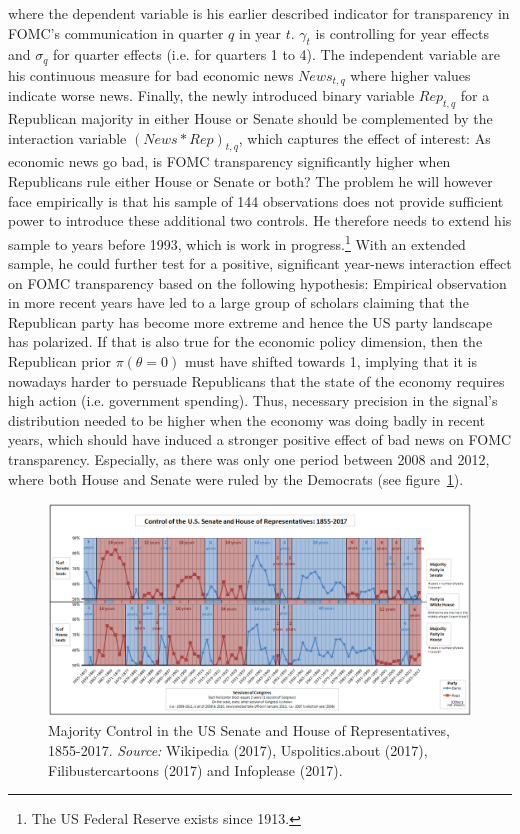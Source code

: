 \documentclass[paper=a4,12pt,DIV=11,twoside=false]{scrartcl}
\begin{document}
\noindent where the dependent variable is his earlier described indicator for transparency in FOMC's communication in quarter $q$ in year $t$. $\gamma_{t}$ is controlling for year effects and $\sigma_{q}$ for quarter effects (i.e. for quarters 1 to 4). The independent variable are his continuous measure for bad economic news $News_{t,q}$ where higher values indicate worse news. Finally, the newly introduced binary variable $Rep_{t,q}$ for a Republican majority in either House or Senate should be complemented by the interaction variable $(News*Rep)_{t,q}$, which captures the effect of interest: As economic news go bad, is FOMC transparency significantly higher when Republicans rule either House or Senate or both? The problem he will however face empirically is that his sample of 144 observations does not provide sufficient power to introduce these additional two controls. He therefore needs to extend his sample to years before 1993, which is work in progress.\footnote{The US Federal Reserve exists since 1913.} With an extended sample, he could further test for a positive, significant year-news interaction effect on FOMC transparency based on the following hypothesis: Empirical observation in more recent years have led to a large group of scholars claiming that the Republican party has become more extreme and hence the US party landscape has polarized. If that is also true for the economic policy dimension, then the Republican prior $\pi(\theta=0)$ must have shifted towards 1, implying that it is nowadays harder to persuade Republicans that the state of the economy requires high action (i.e. government spending). Thus, necessary precision in the signal's distribution needed to be higher when the economy was doing badly in recent years, which should have induced a stronger positive effect of bad news on FOMC transparency. Especially, as there was only one period between 2008 and 2012, where both House and Senate were ruled by the Democrats (see figure~\ref{fig:congress}).

\begin{figure}[h]
\centering
\includegraphics[width=\textwidth]{congress.png}
\caption{Majority Control in the US Senate and House of Representatives, 1855-2017. \textit{Source:} Wikipedia (2017), Uspolitics.about (2017), Filibustercartoons (2017) and Infoplease (2017).}
\label{fig:congress}
\end{figure}
\end{document}
